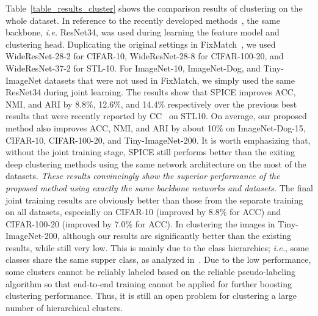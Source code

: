 \documentclass[journal]{IEEEtran}
\newcommand{\ie}{\emph{i.e.}\xspace}
\begin{document}
Table~\ref{table_results_cluster} shows the comparison results of clustering on the whole dataset.
In reference to the recently developed methods~\cite{IIC2019, gatcluster, cc}, the same backbone, \ie ResNet34, was used during learning the feature model and clustering head. Duplicating the original settings in FixMatch~\cite{fixmatch}, we used WideResNet-28-2 for CIFAR-10, WideResNet-28-8 for CIFAR-100-20, and WideResNet-37-2 for STL-10. For ImageNet-10, ImageNet-Dog, and Tiny-ImageNet datasets that were not used in FixMatch, we simply used the same ResNet34 during joint learning.
The results show that SPICE improves ACC, NMI, and ARI by 8.8\%, 12.6\%, and 14.4\% respectively over the previous best results that were recently reported by CC~\cite{cc} on STL10. On average, our proposed method also improves ACC, NMI, and ARI by about 10\% on ImageNet-Dog-15, CIFAR-10, CIFAR-100-20, and Tiny-ImageNet-200.
It is worth emphasizing that, without the joint training stage, SPICE still performs better than the exiting deep clustering methods using the same network architecture on the most of the datasets.
\emph{These results convincingly show the superior performance of the proposed method using exactly the same backbone networks and datasets.}
The final joint training results are obviously better than those from the separate training on all datasets, especially on CIFAR-10 (improved by 8.8\% for ACC) and CIFAR-100-20 (improved by 7.0\% for ACC).
In clustering the images in Tiny-ImageNet-200, although our results are significantly better than the existing results, while still very low. This is mainly due to the class hierarchies; \ie, some classes share the same supper class, as analyzed in~\cite{scan}. Due to the low performance, some clusters cannot be reliably labeled based on the reliable pseudo-labeling algorithm so that end-to-end training cannot be applied for further boosting clustering performance. Thus, it is still an open problem for clustering a large number of hierarchical clusters.
\end{document}
